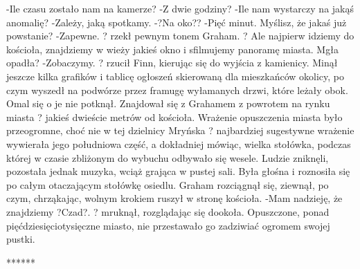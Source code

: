 \documentclass[../MAIN.tex]{subfiles}
\begin{document}
-Ile czasu zostało nam na kamerze?
-Z dwie godziny?
-Ile nam wystarczy na jakąś anomalię?
-Zależy, jaką spotkamy.
-?Na oko??
-Pięć minut. Myślisz, że jakaś już powstanie?
-Zapewne. ? rzekł pewnym tonem Graham. ? Ale najpierw idziemy do kościoła, znajdziemy w wieży jakieś okno i sfilmujemy panoramę miasta. Mgła opadła?
-Zobaczymy. ? rzucił Finn, kierując się do wyjścia z kamienicy. Minął jeszcze kilka grafików i tablicę ogłoszeń skierowaną dla mieszkańców okolicy, po czym wyszedł na podwórze przez framugę wyłamanych drzwi, które leżały obok. Omal się o je nie potknął.
Znajdował się z Grahamem z powrotem na rynku miasta ? jakieś dwieście metrów od kościoła. Wrażenie opuszczenia miasta było przeogromne, choć nie w tej dzielnicy Mryńska ? najbardziej sugestywne wrażenie wywierała jego południowa część, a dokładniej mówiąc, wielka stołówka, podczas której w czasie zbliżonym do wybuchu odbywało się wesele.
Ludzie zniknęli, pozostała jednak muzyka, wciąż grająca w pustej sali. Była głośna i roznosiła się po całym otaczającym stołówkę osiedlu.
Graham rozciągnął się, ziewnął, po czym, chrząkając, wolnym krokiem ruszył w stronę kościoła.
-Mam nadzieję, że znajdziemy ?Czad?. ? mruknął, rozglądając się dookoła.
Opuszczone, ponad pięćdziesięciotysięczne miasto, nie przestawało go zadziwiać ogromem swojej pustki.

******
\end{document}
